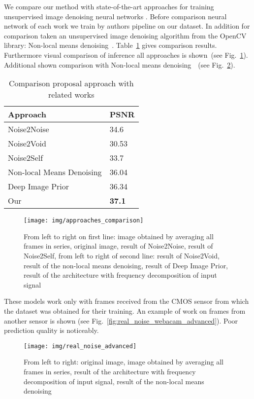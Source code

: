 \documentclass[runningheads]{llncs}
\begin{document}
We compare our method with state-of-the-art approaches for training unsupervised image denoising neural networks . Before comparison neural network of each work we train by authors pipeline on our dataset. In addition for comparison taken an unsupervised image denoising algorithm from the OpenCV library: Non-local means denoising~\cite{nlmd_paper}. Table~\ref{tab:comparison} gives comparison results. Furthermore visual comparison of inference all approaches is shown~(see Fig.~\ref{fig:approaches_comparison}). Additional shown comparison with Non-local means denoising~\cite{nlmd_paper}~(see Fig.~\ref{fig:real_noise_advanced}).

\begin{table}
\centering
\caption{Comparison proposal approach with related works}\label{tab:comparison}	
\begin{tabular}{|l|l|}	
	\hline	
	Approach &  PSNR \\	
	\hline	
	Noise2Noise &  {34.6} \\	
	Noise2Void &  {30.53} \\	
	Noise2Self & {33.7} \\
	Non-local Means Denoising\hspace{1cm} & {36.04} \\
	Deep Image Prior & {36.34} \\
	Our & {\bfseries 37.1} \\	
	\hline	
\end{tabular}	
\end{table}


\begin{figure}
	\centering
	\texttt{[image: img/approaches\_comparison]}
	\caption{From left to right on first line: image obtained by averaging all frames in series, original image, result of Noise2Noise, result of Noise2Self, from left to right of second line: result of Noise2Void, result of the non-local means denoising, result of Deep Image Prior, result of the architecture with frequency decomposition of input signal}
	\label{fig:approaches_comparison}
\end{figure}

These models work only with frames received from the CMOS sensor from which the dataset was obtained for their training. An example of work on frames from another sensor is shown (see Fig.~\ref{fig:real_noise_webacam_advanced}). Poor prediction quality is noticeably.


\begin{figure}
	\centering
	\texttt{[image: img/real\_noise\_advanced]}
	\caption{From left to right: original image, image obtained by averaging all frames in series, result of the architecture with frequency decomposition of input signal, result of the non-local means denoising}
	\label{fig:real_noise_advanced}
\end{figure}
\end{document}
